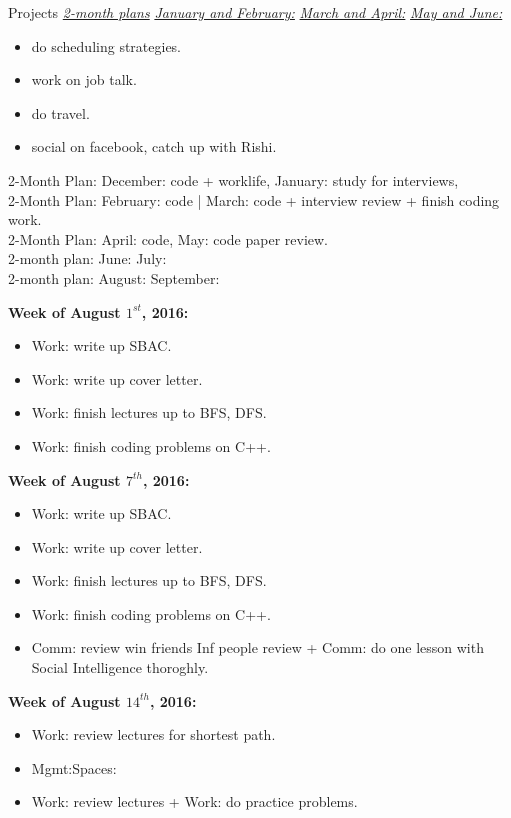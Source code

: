 \documentclass[serif, mathserif, final]{beamer}
\begin{document}
\begin{frame}
\begin{columns}
\begin{block}{Projects}
\underline{\textit{2-month plans}}
\underline{\textit{January and February:}}
\underline{\textit{March and April:}} 
\underline{\textit{May and June:}}
\begin{itemize}
\tiny \item \tiny do scheduling strategies. 
\item \tiny work on job talk. 
\item \tiny do travel. 
\item \tiny social on facebook, catch up with Rishi. 
\end{itemize}

\begin{block}
2-Month Plan: December: code + worklife, January: study for interviews,  \\
2-Month Plan: February: code | March:  code + interview review + finish coding work.    \\ 
2-Month Plan: April: code, May: code paper review. \\
2-month plan: June:  July:  \\ 
2-month plan: August:  September: \\
\end{block} 

\bf{Week of August $1^{st}$, 2016:} \\
\begin{itemize} 
\tiny \item \tiny Work: write up SBAC. 
\item \tiny Work: write up  cover letter. 
\item \tiny Work: finish lectures up to BFS, DFS. 
\item \tiny Work: finish coding problems on C++. 
\end{itemize} 

\bf{Week of August $7^{th}$, 2016:} \\
\begin{itemize} 
\tiny \item \tiny Work: write up SBAC. 
\item \tiny Work: write up  cover letter. 
\item \tiny Work: finish lectures up to BFS, DFS. 
\item \tiny Work: finish coding problems on C++. 
\item \tiny Comm: review win friends Inf people review + Comm: do one lesson with Social Intelligence thoroghly. 
\end{itemize} 

\bf{Week of August $14^{th}$, 2016:} \\ 
\begin{itemize} 
\tiny \item \tiny Work: review lectures for shortest path. 
\item \tiny Mgmt:Spaces: 
\tiny \item \tiny Work: review lectures + Work: do practice problems.
\end{itemize}


\end{block}
\end{columns}
\end{frame}
\end{document}

